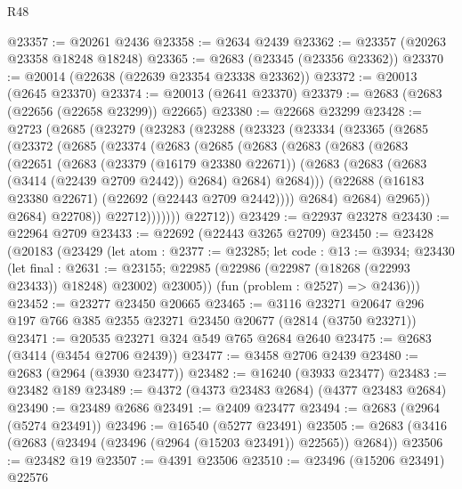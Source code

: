 \begin{lexlean}{R48}
\begin{coremodule}
@23357 := @20261 @2436
@23358 := @2634 @2439
@23362 := @23357 (@20263 @23358 @18248 @18248)
@23365 := @2683 (@23345 (@23356 @23362))
@23370 := @20014 (@22638 (@22639 @23354 @23338 @23362))
@23372 := @20013 (@2645 @23370)
@23374 := @20013 (@2641 @23370)
@23379 := @2683 (@2683 (@22656 (@22658 @23299)) @22665)
@23380 := @22668 @23299
@23428 := @2723
    (@2685
      (@23279
        (@23283
          (@23288
            (@23323
              (@23334
                (@23365
                  (@2685
                    (@23372
                      (@2685
                        (@23374
                          (@2683
                            (@2685
                              (@2683
                                (@2683
                                  (@2683
                                    (@2683
                                      (@22651
                                        (@2683
                                          (@23379 (@16179 @23380 @22671))
                                          (@2683
                                            (@2683 (@2683 (@3414 (@22439 @2709 @2442)) @2684) @2684)
                                            @2684)))
                                      (@22688 (@16183 @23380 @22671) (@22692 (@22443 @2709 @2442))))
                                    @2684)
                                  @2684)
                                @2965))
                            @2684)
                          @22708))
                      @22712)))))))
        @22712))
@23429 := @22937 @23278
@23430 := @22964 @2709
@23433 := @22692 (@22443 @3265 @2709)
@23450 := @23428
    (@20183
      (@23429
        (let atom : @2377 := @23285;
        let code : @13 := @3934;
        @23430
          (let final : @2631 := @23155;
          @22985 (@22986 (@22987 (@18268 (@22993 @23433)) @18248) @23002) @23005))
        (fun (problem : @2527) => @2436)))
@23452 := @23277 @23450 @20665
@23465 := @3116 @23271 @20647 @296 @197 @766 @385 @2355 @23271 @23450 @20677 (@2814 (@3750 @23271))
@23471 := @20535 @23271 @324 @549 @765 @2684 @2640
@23475 := @2683 (@3414 (@3454 @2706 @2439))
@23477 := @3458 @2706 @2439
@23480 := @2683 (@2964 (@3930 @23477))
@23482 := @16240 (@3933 @23477)
@23483 := @23482 @189
@23489 := @4372 (@4373 @23483 @2684) (@4377 @23483 @2684)
@23490 := @23489 @2686
@23491 := @2409 @23477
@23494 := @2683 (@2964 (@5274 @23491))
@23496 := @16540 (@5277 @23491)
@23505 := @2683 (@3416 (@2683 (@23494 (@23496 (@2964 (@15203 @23491)) @22565)) @2684))
@23506 := @23482 @19
@23507 := @4391 @23506
@23510 := @23496 (@15206 @23491) @22576

\end{coremodule}
\end{lexlean}
